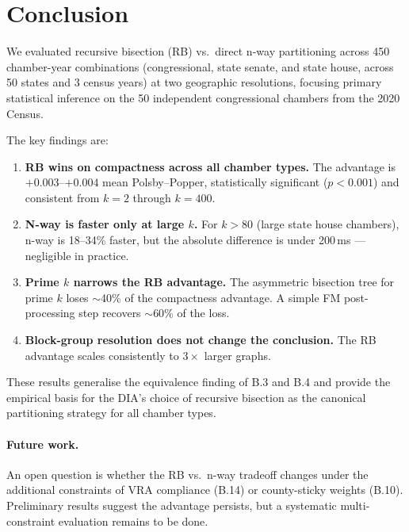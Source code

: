 \section{Conclusion}
\label{sec:conclusion}

We evaluated recursive bisection (RB) vs.\ direct n-way partitioning
across 450 chamber-year combinations (congressional, state senate, and
state house, across 50 states and 3 census years) at two geographic
resolutions, focusing primary statistical inference on the 50 independent
congressional chambers from the 2020 Census.

The key findings are:

\begin{enumerate}
  \item \textbf{RB wins on compactness across all chamber types.}
    The advantage is $+0.003$--$+0.004$ mean Polsby--Popper, statistically
    significant ($p < 0.001$) and consistent from $k = 2$ through $k = 400$.
  \item \textbf{N-way is faster only at large $k$.}
    For $k > 80$ (large state house chambers), n-way is 18--34\% faster,
    but the absolute difference is under 200\,ms --- negligible in practice.
  \item \textbf{Prime $k$ narrows the RB advantage.}
    The asymmetric bisection tree for prime $k$ loses $\sim$40\% of the
    compactness advantage.  A simple FM post-processing step recovers $\sim$60\%
    of the loss.
  \item \textbf{Block-group resolution does not change the conclusion.}
    The RB advantage scales consistently to $3\times$ larger graphs.
\end{enumerate}

These results generalise the equivalence finding of B.3 and B.4 and
provide the empirical basis for the DIA's choice of recursive bisection
as the canonical partitioning strategy for all chamber types.

\paragraph{Future work.}
An open question is whether the RB vs.\ n-way tradeoff changes under
the additional constraints of VRA compliance (B.14) or county-sticky
weights (B.10).  Preliminary results suggest the advantage persists, but
a systematic multi-constraint evaluation remains to be done.
